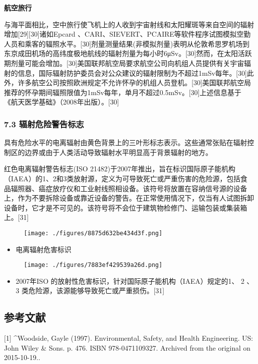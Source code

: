 \textbf{航空旅行}

与海平面相比，空中旅行使飞机上的人收到宇宙射线和太阳耀斑等来自空间的辐射增加[29][30]诸如Epcard 、CARI、SIEVERT、PCAIRE等软件程序试图模拟空勤人员和乘客的辐照水平。[30]剂量测量结果(非模拟剂量)表明从伦敦希思罗机场到东京成田机场的高纬度极地航线的辐射剂量为每小时6μSv。[30]然而，在太阳活跃期剂量可能会增加。[30]美国联邦航空局要求航空公司向机组人员提供有关宇宙辐射的信息，国际辐射防护委员会对公众建议的辐射限制为不超过1mSv每年。[30]此外，许多航空公司按照欧洲规定不允许怀孕的机组人员登机。[30]美国联邦航空局推荐的怀孕期间辐照限值为1mSv每年，单月不超过0.5mSv。[30]上述信息基于《航天医学基础》（2008年出版）。[30]

\subsubsection{7.3 辐射危险警告标志}
具有危险水平的电离辐射由黄色背景上的三叶形标志表示。这些通常张贴在辐射控制区的边界或由于人类活动导致辐射水平明显高于背景辐射的地方。

红色电离辐射警告标志(ISO 21482)于2007年推出，旨在标识国际原子能机构（IAEA）的1、2和3类放射源，定义为可导致死亡或严重伤害的危险源，包括食品辐照器、癌症放疗仪和工业射线照相设备。该符号将放置在容纳信号源的设备上，作为不要拆除设备或靠近设备的警告。在正常使用情况下，仅当有人试图拆卸设备时，它才是不可见的。该符号将不会位于建筑物检修门、运输包装或集装箱上。[31]
\begin{figure}[ht]
\centering
\texttt{[image: ./figures/8875d632be434d3f.png]}
\caption\label{fig_DLFS_9}
\end{figure}
\begin{itemize}
\item 电离辐射危害标识
\end{itemize}
\begin{figure}[ht]
\centering
\texttt{[image: ./figures/7883ef429539a26d.png]}
\caption\label{fig_DLFS_10}
\end{figure}
\begin{itemize}
\item 2007年ISO 的放射性危害标识，针对国际原子能机构（IAEA）规定的1、 2 、3 类危险源，该源能够导致死亡或严重损伤。[31]
\end{itemize}

\subsection{参考文献}
[1]
^Woodside, Gayle (1997). Environmental, Safety, and Health Engineering. US: John Wiley & Sons. p. 476. ISBN 978-0471109327. Archived from the original on 2015-10-19..


